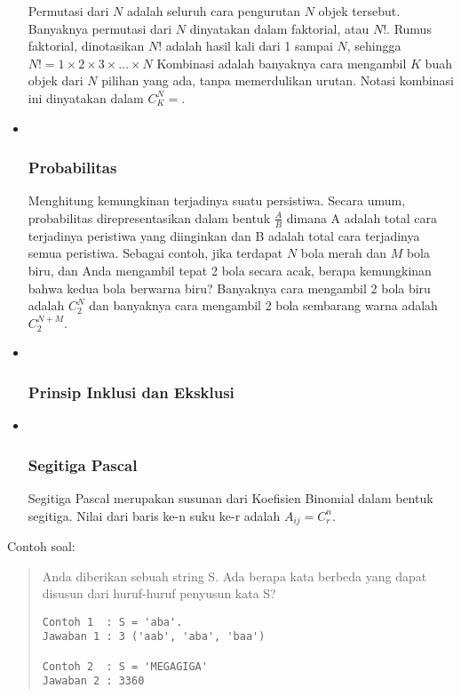 \documentclass[]{article}
\begin{document}
\begin{itemize}
  Permutasi dari \(N\) adalah seluruh cara pengurutan \(N\) objek
  tersebut. Banyaknya permutasi dari \(N\) dinyatakan dalam faktorial,
  atau \(N!\). Rumus faktorial, dinotasikan \(N!\) adalah hasil kali
  dari 1 sampai \(N\), sehingga
  \(N! = 1 \times 2 \times 3 \times \dots \times N\) Kombinasi adalah
  banyaknya cara mengambil \(K\) buah objek dari \(N\) pilihan yang ada,
  tanpa memerdulikan urutan. Notasi kombinasi ini dinyatakan dalam
  \(C^{N}_{K} = \).
\item ~
  \subsubsection{Probabilitas}\label{probabilitas}

  Menghitung kemungkinan terjadinya suatu persistiwa. Secara umum,
  probabilitas direpresentasikan dalam bentuk \(\frac{A}{B}\) dimana A
  adalah total cara terjadinya peristiwa yang diinginkan dan B adalah
  total cara terjadinya semua peristiwa. Sebagai contoh, jika terdapat
  \(N\) bola merah dan \(M\) bola biru, dan Anda mengambil tepat 2 bola
  secara acak, berapa kemungkinan bahwa kedua bola berwarna biru?
  Banyaknya cara mengambil 2 bola biru adalah \(C^{N}_{2} \) dan
  banyaknya cara mengambil 2 bola sembarang warna adalah \(C^{N+M}_2 \).
\item ~
  \subsubsection{Prinsip Inklusi dan
  Eksklusi}\label{prinsip-inklusi-dan-eksklusi}
\item ~
  \subsubsection{Segitiga Pascal}\label{segitiga-pascal}

  Segitiga Pascal merupakan susunan dari Koefisien Binomial dalam bentuk
  segitiga. Nilai dari baris ke-n suku ke-r adalah
  \(A_{ij} = C^{n}_{r}\).
\end{itemize}

Contoh soal:

\begin{quote}
Anda diberikan sebuah string S. Ada berapa kata berbeda yang dapat
disusun dari huruf-huruf penyusun kata S?

\begin{verbatim}
Contoh 1  : S = 'aba'. 
Jawaban 1 : 3 ('aab', 'aba', 'baa')

Contoh 2  : S = 'MEGAGIGA'
Jawaban 2 : 3360
\end{verbatim}
\end{quote}
\end{document}

